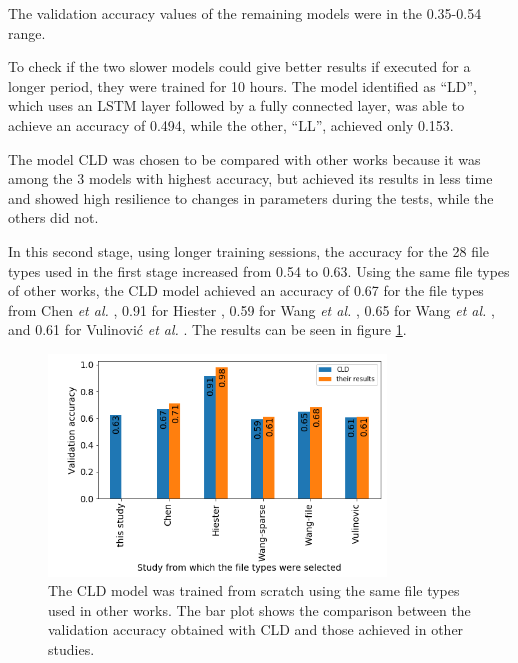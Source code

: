 The validation accuracy values of the remaining models were in the 0.35-0.54 range.


To check if the two slower models could give better results if executed for a longer period, they were trained for 10 hours. The model identified as ``LD'', which uses an LSTM layer followed by a fully connected layer, was able to achieve an accuracy of 0.494, while the other, ``LL'', achieved only 0.153.



The model CLD was chosen to be compared with other works because it was among the 3 models with highest accuracy, but achieved its results in less time and showed high resilience to changes in parameters during the tests, while the others did not.
 
In this second stage, using longer training sessions, the accuracy for the 28 file types used in the first stage increased from 0.54 to 0.63. Using the same file types of other works, the CLD model achieved an accuracy of 
0.67 for the file types from Chen \textit{et al.} \cite{chen_file_2018},
0.91 for Hiester \cite{hiester_file_2018}, 
0.59 for Wang \textit{et al.} \cite{wang_sparse_2018},
0.65 for Wang \textit{et al.} \cite{wang_file_2018},
and
0.61 for Vulinović \textit{et al.} \cite{vulinovic_neural_2019}.
The results can be seen in figure \ref{fig:cldothers}.

\noindent
\begin{figure}[htb!]
\centering\includegraphics[width=0.8\textwidth]{content/CLD-others.png}
\caption[CLD vs. other studies]{\label{fig:cldothers}The CLD model was trained from scratch using the same file types used in other works. The bar plot shows the comparison between the validation accuracy obtained with CLD and those achieved in other studies.}%
\end{figure}